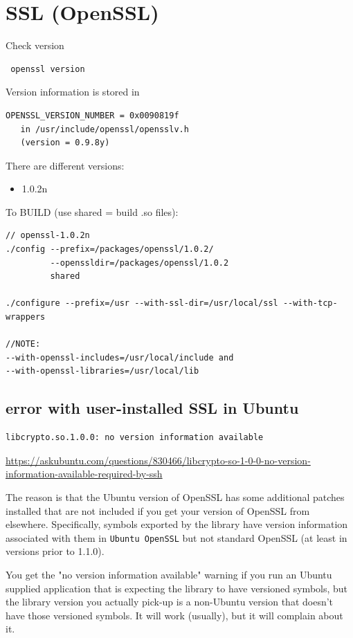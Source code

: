 \section{SSL (OpenSSL)}
\label{sec:SSL}
\label{sec:OpenSSL}

Check version
\begin{verbatim}
 openssl version
\end{verbatim}

Version information is stored in
\begin{verbatim}
OPENSSL_VERSION_NUMBER = 0x0090819f 
   in /usr/include/openssl/opensslv.h
   (version = 0.9.8y)
\end{verbatim}

There are different versions:
\begin{itemize}
  \item 1.0.2n 
\end{itemize}

To BUILD (use shared = build .so files):
\begin{verbatim}
// openssl-1.0.2n
./config --prefix=/packages/openssl/1.0.2/ 
         --openssldir=/packages/openssl/1.0.2
         shared

./configure --prefix=/usr --with-ssl-dir=/usr/local/ssl --with-tcp-wrappers

//NOTE:
--with-openssl-includes=/usr/local/include and
--with-openssl-libraries=/usr/local/lib

\end{verbatim}

\subsection{error with user-installed SSL in Ubuntu}

{\tiny
\begin{verbatim}
libcrypto.so.1.0.0: no version information available
\end{verbatim}
}
\url{https://askubuntu.com/questions/830466/libcrypto-so-1-0-0-no-version-information-available-required-by-ssh}

The reason is that the Ubuntu version of OpenSSL has some additional patches
installed that are not included if you get your version of OpenSSL from elsewhere. 
Specifically, symbols exported by the library have version information
associated with them in \verb!Ubuntu OpenSSL! but not standard OpenSSL (at least
in versions prior to 1.1.0).

You get the "no version information available" warning if you run an Ubuntu
supplied application that is expecting the library to have versioned symbols,
but the library version you actually pick-up is a non-Ubuntu version that
doesn't have those versioned symbols. It will work (usually), but it will
complain about it.

